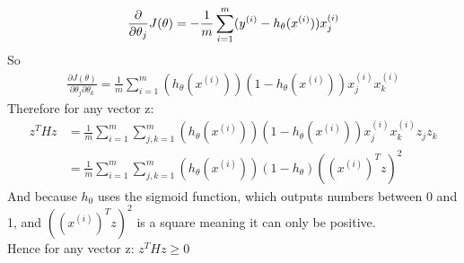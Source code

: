 \begin{answer}
    \begin{equation}
        \frac{\partial}{\partial \theta_{j}}J(\theta) = -\frac{1}{m}\sum_{i=1}^{m}(y^{(i)}-h_{\theta}(x^{(i)}))x_j^{(i)} \\
    \end{equation}
    So
    \begin{align}
        \frac{\partial J(\theta)}{\partial \theta_{j}\partial \theta_{k}} = \frac{1}{m}\sum_{i=1}^{m}(h_{\theta}(x^{(i)}))(1-h_{\theta}(x^{(i)}))x_j^{(i)}x_k^{(i)}
    \end{align}
    Therefore for any vector z:
    \begin{align}
        z^T H z &= \frac{1}{m}\sum_{i=1}^{m}\sum_{j,k=1}^{m}(h_{\theta}(x^{(i)}))(1-h_{\theta}(x^{(i)}))x_j^{(i)}x_k^{(i)}z_j z_k\\
                &= \frac{1}{m}\sum_{i=1}^{m}\sum_{j,k=1}^{m}(h_{\theta}(x^{(i)}))(1-h_{\theta})((x^{(i)})^Tz)^2 
    \end{align}
    And because $h_0$ uses the sigmoid function, which outputs numbers between 0 and 1, and $((x^{(i)})^Tz)^2$ is a square meaning it can only be positive.\\
    Hence for any vector z: $z^THz \geq 0$
\end{answer}